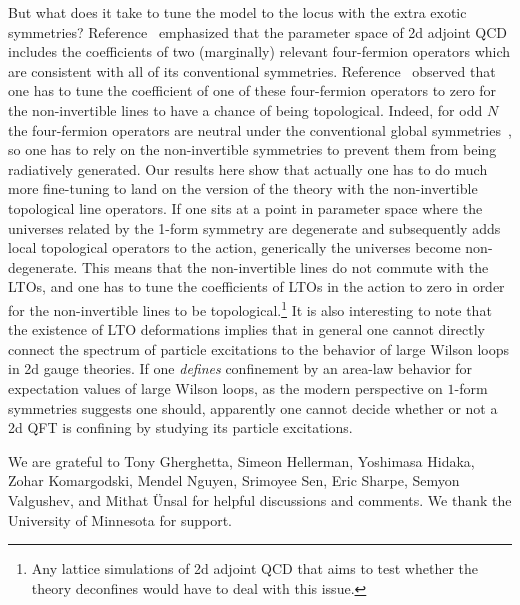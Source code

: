 \documentclass[11pt]{article}
\begin{document}
But what does it take to tune the model to the locus with the extra exotic symmetries?   Reference~\cite{Cherman:2019hbq} emphasized that the parameter space of 2d adjoint QCD includes the coefficients of two (marginally) relevant four-fermion operators which are consistent with all of its conventional symmetries.  Reference~\cite{Komargodski:2020mxz} observed that one has 
to tune the coefficient of one of these four-fermion operators to zero for the non-invertible lines to have a chance of being topological.  Indeed, for odd $N$ the four-fermion operators are neutral under the conventional global symmetries~\cite{Cherman:2019hbq}, so one has to rely on the non-invertible symmetries to prevent them from being radiatively generated. Our results here show that actually one has to do much more fine-tuning to land on the version of the theory with the non-invertible topological line operators.  If one sits at a point in parameter space where the universes related by the 1-form symmetry are degenerate and subsequently adds local topological operators to the action, generically the universes become non-degenerate.  This means that the non-invertible lines do not commute with the LTOs, and one has to tune the coefficients of LTOs in the action to zero in order for the non-invertible lines to be topological.\footnote{Any lattice simulations of 2d adjoint QCD that aims to test whether the theory deconfines would have to deal with this issue.}  
It is also interesting to note that the existence of LTO deformations implies that in general one cannot directly connect the spectrum of particle excitations to the behavior of large Wilson loops in 2d gauge theories.
If one \emph{defines} confinement by an area-law behavior for expectation values of large Wilson loops, as the modern perspective on $1$-form symmetries suggests one should, apparently one cannot decide whether or not a 2d QFT is confining by studying its particle excitations. 


\acknowledgments

We are grateful to Tony Gherghetta, Simeon Hellerman, Yoshimasa Hidaka, Zohar Komargodski, Mendel Nguyen, Srimoyee Sen, Eric Sharpe, Semyon Valgushev, and Mithat \"Unsal for helpful discussions and comments.  We thank the University of Minnesota for support. 
\end{document}
